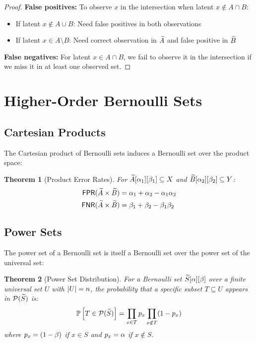 \documentclass[11pt,final,hidelinks]{article}
\newtheorem{theorem}{Theorem}[section]
\begin{document}
\begin{proof}
\textbf{False positives:} To observe $x$ in the intersection when latent $x \notin A \cap B$:
\begin{itemize}
    \item If latent $x \notin A \cup B$: Need false positives in both observations
    \item If latent $x \in A \setminus B$: Need correct observation in $\widetilde{A}$ and false positive in $\widetilde{B}$
\end{itemize}

\textbf{False negatives:} For latent $x \in A \cap B$, we fail to observe it in the intersection if we miss it in at least one observed set.
\end{proof}

\section{Higher-Order Bernoulli Sets}

\subsection{Cartesian Products}

The Cartesian product of Bernoulli sets induces a Bernoulli set over the product space:

\begin{theorem}[Product Error Rates]
For $\widetilde{A}[\alpha_1][\beta_1] \subseteq X$ and $\widetilde{B}[\alpha_2][\beta_2] \subseteq Y$:
\begin{align}
\mathsf{FPR}(\widetilde{A} \times \widetilde{B}) &= \alpha_1 + \alpha_2 - \alpha_1\alpha_2 \\
\mathsf{FNR}(\widetilde{A} \times \widetilde{B}) &= \beta_1 + \beta_2 - \beta_1\beta_2
\end{align}
\end{theorem}

\subsection{Power Sets}

The power set of a Bernoulli set is itself a Bernoulli set over the power set of the universal set:

\begin{theorem}[Power Set Distribution]
For a Bernoulli set $\widetilde{S}[\alpha][\beta]$ over a finite universal set $U$ with $\lvert U\rvert = n$, the probability that a specific subset $T \subseteq U$ appears in $\mathcal{P}(\widetilde{S})$ is:
\begin{equation}
\mathbb{P}\left[T \in \mathcal{P}(\widetilde{S})\right] = \prod_{x \in T} p_x \prod_{x \notin T} (1-p_x)
\end{equation}
where $p_x = (1-\beta)$ if $x \in S$ and $p_x = \alpha$ if $x \notin S$.
\end{theorem}
\end{document}
